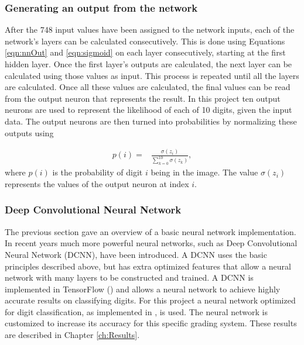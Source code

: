 \subsubsection{Generating an output from the network}
After the 748 input values have been assigned to the network inputs, each of the network's layers can be calculated consecutively. This is done using Equations \ref{eqn:nnOut} and \ref{eqn:sigmoid} on each layer consecutively, starting at the first hidden layer. Once the first layer's outputs are calculated, the next layer can be calculated using those values as input. This process is repeated until all the layers are calculated. Once all these values are calculated, the final values can be read from the output neuron that represents the result. In this project ten output neurons are used to represent the likelihood of each of 10 digits, given the input data. The output neurons are then turned into probabilities by normalizing these outputs using


\begin{align}
  p(i) =  &\displaystyle{\frac{\sigma(z_{i})}{\sum_{k=0}^{10} \sigma(z_{k})}},
\label{eqn:normal}
\end{align}
where $p(i)$ is the probability of digit $i$ being in the image. The value $\sigma(z_{i})$ represents the values of the output neuron at index $i$.

\subsubsection{Deep Convolutional Neural Network}

The previous section gave an overview of a basic neural network implementation. In recent years much more powerful neural networks, such as Deep Convolutional Neural Network (DCNN), have been introduced. A DCNN uses the basic principles described above, but has extra optimized features that allow a neural network with many layers to be constructed and trained. A DCNN is implemented in TensorFlow (\citet{Tensor}) and allows a neural network to achieve highly accurate results on classifying digits. For this project a neural network optimized for digit classification, as implemented in \citet{Tensor}, is used. The neural network is customized to increase its accuracy for this specific grading system. These results are described in Chapter \ref{ch:Results}.

